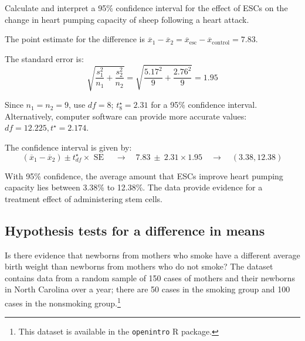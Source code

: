 \begin{examplewrap}
\begin{nexample}{Calculate and interpret a 95\% confidence interval for the effect of ESCs on the change in heart pumping capacity of sheep following a heart attack.}
	
The point estimate for the difference is $\overline{x}_1 - \overline{x}_2 = \overline{x}_{\text{esc}} - \overline{x}_{\text{control}} = 7.83$.	
	
The standard error is:	
\[\sqrt{\frac{s_{1}^2}{n_{1}} + \frac{s_{2}^2}{n_{2}}} = \sqrt{\frac{5.17^2}{9} + \frac{2.76^2}{9}} = 1.95\]
	
Since $n_1 = n_2 = 9$, use $df = 8$; $t^{\star}_{8} = 2.31$ for a 95\% confidence interval. Alternatively, computer software can provide more accurate values: $df = 12.225, t^\star = 2.174$.

The confidence interval is given by:
\[(\overline{x}_{1} - \overline{x}_{2}) \pm t^\star_{df} \times \text{ SE } \quad\rightarrow\quad
7.83 \ \pm\ 2.31\times 1.95 \quad\rightarrow\quad (3.38, 12.38) \]

With 95\% confidence, the average amount that ESCs improve heart pumping capacity lies between 3.38\% to 12.38\%.\footnotemark{} The data provide evidence for a treatment effect of administering stem cells.
\end{nexample}
\end{examplewrap}


\subsection{Hypothesis tests for a difference in means}
\label{testingDifferenceMeans}




Is there evidence that newborns from mothers who smoke have a different average birth weight than newborns from mothers who do not smoke? The dataset  contains data from a random sample of 150 cases of mothers and their newborns in North Carolina over a year; there are 50 cases in the smoking group and 100 cases in the nonsmoking group.\footnote{This dataset is available in the \texttt{openintro} \textsf{R} package. }

